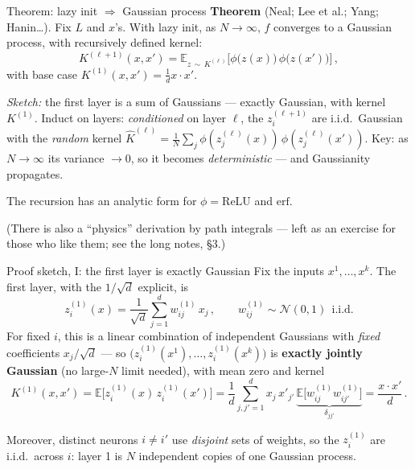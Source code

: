 \documentclass[11pt]{beamer}
\newcommand{\E}{\mathbb{E}}
\newcommand{\hl}[1]{{\color{blue!60!black}\textbf{#1}}}
\begin{document}
\begin{frame}{Theorem: lazy init $\Rightarrow$ Gaussian process}
  \textbf{Theorem} (Neal; Lee et al.; Yang; Hanin\dots).
  Fix $L$ and $x$'s. With lazy init, as $N \to \infty$, $f$ converges to
  a Gaussian process, with recursively defined kernel:
  \[
    K^{(\ell+1)}(x,x') =  \E_{z\,\sim\, K^{(\ell)}}
    \Big[\phi\big(z(x)\big)\,\phi\big(z(x')\big)\Big]\,,
  \]
  with base case $K^{(1)}(x,x') =  \frac{1}{d}x\cdot x'$. \pause
  
  \smallskip 
  \emph{Sketch:} the first layer is a sum of Gaussians --- exactly
  Gaussian, with kernel $K^{(1)}$. Induct on layers:
  \emph{conditioned} on layer $\ell$, the $z^{(\ell+1)}_i$ are i.i.d.\
  Gaussian with the \emph{random} kernel
  $\widehat K^{(\ell)} = \frac{1}{N}\sum_j
  \phi(z_j^{(\ell)}(x))\,\phi(z_j^{(\ell)}(x'))$.
  Key: as $N\to\infty$ its variance $\to 0$, so it becomes
  \emph{deterministic} --- and Gaussianity propagates.  \pause
  \vspace{2mm}

  The recursion has an analytic form for $\phi = \mathrm{ReLU}$ and
  $\mathrm{erf}$. \pause
  \vspace{1mm}

  {\footnotesize (There is also a ``physics'' derivation by path
  integrals --- left as an exercise for those who like them; see the
  long notes, \S3.)}
\end{frame}

\begin{frame}{Proof sketch, I: the first layer is exactly Gaussian}
  Fix the inputs $x^1, \dots, x^k$. The first layer, with the
  $1/\sqrt d$ explicit, is
  \[
    z^{(1)}_i(x) = \frac{1}{\sqrt d}\sum_{j=1}^{d} w^{(1)}_{ij}\, x_j\,,
    \qquad w^{(1)}_{ij} \sim \mathcal N(0,1)\ \ \text{i.i.d.}
  \] \pause
  For fixed $i$, this is a linear combination of independent Gaussians
  with \emph{fixed} coefficients $x_j/\sqrt d$ --- so
  $\big(z^{(1)}_i(x^1), \dots, z^{(1)}_i(x^k)\big)$ is \hl{exactly
  jointly Gaussian} (no large-$N$ limit needed), with mean zero \pause and
  kernel
  {\small
  \[
    K^{(1)}(x,x') = \E\big[z^{(1)}_i(x)\, z^{(1)}_i(x')\big]
    = \frac1d \sum_{j,j'=1}^{d} x_j\, x'_{j'}\,
    \underbrace{\E\big[w^{(1)}_{ij} w^{(1)}_{ij'}\big]}_{
    \delta_{jj'}}
    =  \frac{x\cdot x'}{d}\,.
  \]} \pause
 
 Moreover, distinct neurons $i \neq i'$ use \emph{disjoint} sets of
  weights, so the $z^{(1)}_i$ are i.i.d.\ across $i$: layer 1 is $N$
  independent copies of one Gaussian process.
\end{frame}
\end{document}
